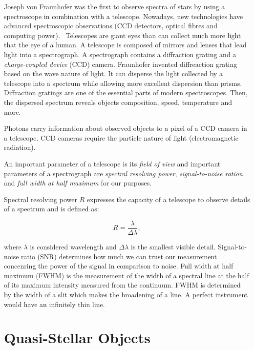 Joseph von Fraunhofer was the first to observe spectra of stars by using a spectroscope in combination with a telescope.
Nowadays, new technologies have advanced spectroscopic observations
(CCD detectors, optical fibres and computing power).~\cite{cochard2018}
Telescopes are giant eyes than can collect much more light that the eye of a human.
A telescope is composed of mirrors and lenses that lead light into a spectrograph.
A spectrograph contains a diffraction grating and a \textit{charge-coupled device} (CCD) camera.
Fraunhofer invented diffreaction grating based on the wave nature of light.
It can disperse the light collected by a telescope into a spectrum
while allowing more excellent dispersion than prisms.
Diffraction gratings are one of the essential parts of modern spectroscopes.
Then, the dispersed spectrum reveals objects composition, speed, temperature
and more.~\cite{bennett2005}

Photons carry information about observed objects
to a pixel of a CCD camera in a telescope.
CCD cameras require the particle nature of light (electromagnetic radiation).~\cite{trypsteen2017}

An important parameter of a telescope is its \textit{field of view}
and important parameters of a spectrograph are \textit{spectral resolving power}, \textit{signal-to-noise ration} and \textit{full width at half maximum} for our purposes.

Spectral resolving power \(R\) expresses the capacity of a telescope to observe details of a spectrum
and is defined as:

\begin{equation}
	R = \frac{\lambda}{\Delta \lambda},
\end{equation}

where \(\lambda\) is considered wavelength
and \(\Delta \lambda\) is the smallest visible detail.
Signal-to-noise ratio (SNR) determines how much we can trust our measurement
concenring the power of the signal in comparison to noise.
Full width at half maximum (FWHM) is the measurement of the width of a spectral line at the half of its maximum intensity measured from the continuum.
FWHM is determined by the width of a slit which makes the broadening of a line.
A perfect instrument would have an infinitely thin line.~\cite{cochard2018}

\section{Quasi-Stellar Objects}

